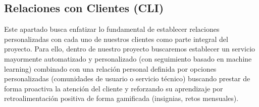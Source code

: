 {}
\subsection*{Relaciones con Clientes (CLI)}

Este apartado busca enfatizar lo fundamental de establecer relaciones personalizadas con cada uno de nuestros clientes como parte integral del proyecto. Para ello, dentro de nuestro proyecto buscaremos establecer un servicio mayormente automatizado y personalizado (con seguimiento basado en machine learning) combinado con una relación personal definida por opciones personalizadas (comunidades de usuario o servicio técnico) buscando prestar de forma proactiva la atención del cliente y reforzando su aprendizaje por retroalimentación positiva de forma gamificada (insignias, retos mensuales).
